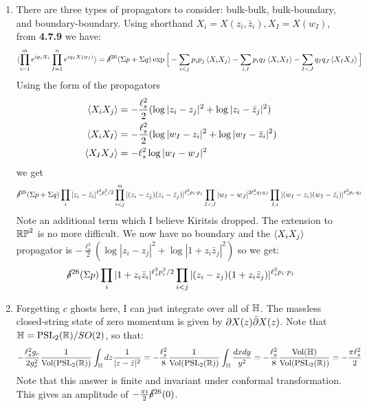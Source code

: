 \documentclass[11pt, class=article, crop=false]{standalone}
\begin{document}
\begin{enumerate}
	\item There are three types of propagators to consider: bulk-bulk, bulk-boundary, and boundary-boundary. Using shorthand $X_i = X(z_i, \bar z_i), X_I = X(w_I)$, from \textbf{4.7.9} we have:
	\[
	\begin{aligned}
		\braket{\prod_{i=1}^m e^{i p_i X_i} \prod_{I=1}^n e^{i q_I X(w_I)}} &= \cancel\delta^{26} (\Sigma p + \Sigma q) \exp\Big[- \sum_{i<j} p_i p_j \braket{X_i X_j} - \sum_{i, I} p_i q_I \braket{X_i X_I} - \sum_{I<J} q_I q_J \braket{X_I X_J} \Big]\\
	\end{aligned}
	\]
	Using the form of the propagators 
	\[
		\begin{aligned}
			\braket{X_i X_j} &= -\frac{\ell_s^2}{2} (\log |z_i - z_j|^2 + \log |z_i - \bar z_j|^2 )\\
			\braket{X_i X_I} &=  -\frac{\ell_s^2}{2} (\log |w_I-z_i|^2 + \log |w_I-\bar z_i|^2)\\
			\braket{X_I X_J} &= -\ell_s^2 \log|w_I-w_J|^2
		\end{aligned}
	\]
	we get
	\[
		\cancel\delta^{26} (\Sigma p + \Sigma q) \prod_{i} |z_i - \bar z_i|^{\ell_s^2 p_i^2/2} \prod_{i<j}^m |(z_i - z_j) (z_i - \bar z_j)|^{\ell_s^2 p_i \cdot p_j} \prod_{I<J} |w_I - w_J|^{2 \ell_s^2 q_I q_J} \prod_{I, i} |(w_I - z_i) (w_I- \bar z_i)|^{\ell_s^2 p_i \cdot q_I}
	\]
	Note an additional term which I believe Kiritsis dropped. The extension to $\mathbb{RP}^2$ is no more difficult. We now have no boundary and the $\braket{X_i X_j}$ propagator is $-\frac{\ell_s^2}{2} (\log|z_i - z_j|^2 + \log|1+z_i \bar z_j|^2)$ so we get:
	\[
		\cancel\delta^{26} (\Sigma p) \prod_{i} |1 + z_i \bar z_i|^{\ell_s^2 p_i^2/2} \prod_{i < j} |(z_i - z_j) (1 + z_i \bar z_j)|^{\ell_s^2 p_i \cdot p_j}
	\]
	
	\item Forgetting $c$ ghosts here, I can just integrate over all of $\mathbb{H}$. The massless closed-string state of zero momentum is given by $\partial X(z) \bar {\partial} X(z)$. Note that $\mathbb{H} = \mathrm{PSL}_2(\mathbb{R}) / SO(2)$, so that:
	\[
		-\frac{\ell_s^2 g_c}{2 g_o^2} \frac{1}{\mathrm{Vol}(\mathrm{PSL}_2(\mathbb{R}))} \int_{\mathbb{H}} dz \frac{1}{|z - \bar z|^2}
		 = -\frac{\ell_s^2}{8} \frac{1}{\mathrm{Vol}(\mathrm{PSL}_2(\mathbb{R}))} \int_{\mathbb{H}} \frac{dx dy}{y^2} = -\frac{\ell_s^2}{8} \frac{\mathrm{Vol}(\mathbb{H})}{\mathrm{Vol}(\mathrm{PSL}_2(\mathbb{R}))} = -\frac{\pi \ell_s^2}{2}
	\]
	 Note that this answer is finite and invariant under conformal transformation. This gives an amplitude of $-\frac{\pi i}{2} \cancel\delta^{26}(0)$. 
	

\end{enumerate}
\end{document}
